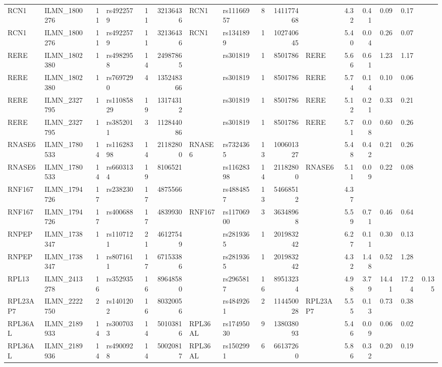 \documentclass{article}
\begin{document}
\begin{landscape}
{\begin{ThreePartTable}
\begin{longtable}{|llr|lrrl|lrrl|rrrr|r|}
  RCN1 & ILMN\_1800276 & 11 & rs4922579 & 11 & 32136436 & RCN1 & rs11166957 & 8 & 141177468 &  & 4.32 & 0.41 & 0.09 & 0.17 &  \\
  RCN1 & ILMN\_1800276 & 11 & rs4922579 & 11 & 32136436 & RCN1 & rs1341899 & 1 & 102740645 &  & 5.40 & 0.04 & 0.26 & 0.07 &  \\
  RERE & ILMN\_1802380 & 1 & rs4982958 & 14 & 24987865 &  & rs301819 & 1 & 8501786 & RERE & 5.66 & 0.61 & 1.23 & 1.17 &  \\
  RERE & ILMN\_1802380 & 1 & rs7697290 & 4 & 135248366 &  & rs301819 & 1 & 8501786 & RERE & 5.74 & 0.14 & 0.10 & 0.06 &  \\
  RERE & ILMN\_2327795 & 1 & rs11085829 & 19 & 13174312 &  & rs301819 & 1 & 8501786 & RERE & 5.12 & 0.21 & 0.33 & 0.21 &  \\
  RERE & ILMN\_2327795 & 1 & rs3852011 & 3 & 112844086 &  & rs301819 & 1 & 8501786 & RERE & 5.71 & 0.08 & 0.60 & 0.26 &  \\
  RNASE6 & ILMN\_1780533 & 14 & rs11628398 & 14 & 21182800 & RNASE6 & rs7324365 & 13 & 100601327 &  & 5.48 & 0.42 & 0.21 & 0.26 &  \\
  RNASE6 & ILMN\_1780533 & 14 & rs6603134 & 19 & 8106521 &  & rs11628398 & 14 & 21182800 & RNASE6 & 5.11 & 0.09 & 0.22 & 0.08 &  \\
  RNF167 & ILMN\_1794726 & 17 & rs238230 & 17 & 4875566 &  & rs4884857 & 13 & 54668512 &  & 4.37 &  &  &  &  \\
  RNF167 & ILMN\_1794726 & 17 & rs400688 & 17 & 4839930 & RNF167 & rs11706900 & 3 & 36348968 &  & 5.59 & 0.71 & 0.46 & 0.64 &  \\
  RNPEP & ILMN\_1738347 & 1 & rs1107121 & 21 & 46127549 &  & rs2819365 & 1 & 201983242 &  & 6.27 & 0.11 & 0.30 & 0.13 &  \\
  RNPEP & ILMN\_1738347 & 1 & rs8071611 & 17 & 67153386 &  & rs2819365 & 1 & 201983242 &  & 4.32 & 1.48 & 0.52 & 1.28 &  \\
  RPL13 & ILMN\_2413278 & 16 & rs352935 & 16 & 89648580 &  & rs2965817 & 16 & 89513234 &  & 4.98 & 3.79 & 14.41 & 17.24 & 0.135 \\
  RPL23AP7 & ILMN\_2222750 & 2 & rs1401202 & 16 & 80320056 &  & rs4849261 & 2 & 114450028 & RPL23AP7 & 5.55 & 0.13 & 0.73 & 0.38 &  \\
  RPL36AL & ILMN\_2189933 & 14 & rs3007033 & 14 & 50103816 & RPL36AL & rs17495030 & 9 & 138038093 &  & 5.46 & 0.09 & 0.06 & 0.02 &  \\
  RPL36AL & ILMN\_2189936 & 14 & rs4900928 & 14 & 50020817 & RPL36AL & rs1502991 & 6 & 66137260 &  & 5.86 & 0.32 & 0.20 & 0.19 &  \\

\end{longtable}
\end{ThreePartTable}}
\end{landscape}
\end{document}
